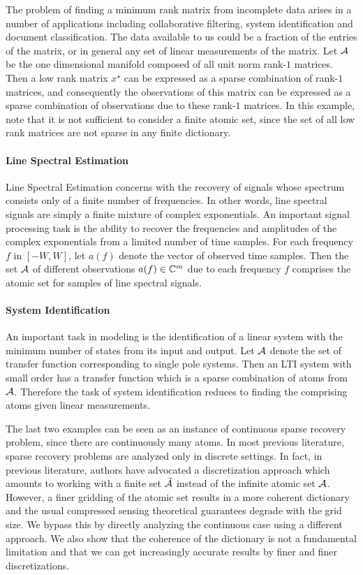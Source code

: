 The problem of finding a minimum rank matrix from incomplete data arises in a
number of applications including collaborative filtering, system identification
and document classification. The data available to us could be a fraction of the
entries of the matrix, or in general any set of linear measurements of the
matrix. Let $\mathcal{A}$ be the one dimensional manifold composed of all unit norm
rank-$1$ matrices. Then a low rank matrix $x^\star$ can be expressed as a sparse
combination of rank-$1$ matrices, and consequently the observations of this
matrix can be expressed as a sparse combination of observations due to these
rank-$1$ matrices. In this example, note that it is not sufficient to consider a
finite atomic set, since the set of all low rank matrices are not sparse in any
finite dictionary.

\paragraph{Line Spectral Estimation} Line Spectral Estimation concerns with the
recovery of signals whose spectrum consists only of a finite number of
frequencies. In other words, line spectral signals are simply a finite mixture
of complex exponentials. An important signal processing task is the ability to
recover the frequencies and amplitudes of the complex exponentials from a
limited number of time samples. For each frequency $f$ in $[-W,W]$, let $a(f)$
denote the vector of observed time samples. Then the set $\mathcal{A}$ of different
observations $a(f) \in \mathbb{C}^m$ due to each frequency $f$ comprises the atomic set
for samples of line spectral signals.

\paragraph{System Identification} An important task in modeling is the
identification of a linear system with the minimum number of states from its
input and output. Let $\mathcal{A}$ denote the set of transfer function corresponding to
single pole systems. Then an LTI system with small order has a transfer function
which is a sparse combination of atoms from $\mathcal{A}$. Therefore the task of system
identification reduces to finding the comprising atoms given linear
measurements.

The last two examples can be seen as an instance of continuous sparse recovery
problem, since there are continuously many atoms. In most previous literature,
sparse recovery problems are analyzed only in discrete settings. In fact, in
previous literature, authors have advocated a discretization approach which
amounts to working with a finite set $\tilde{\mathcal{A}}$ instead of the infinite atomic
set $\mathcal{A}$. However, a finer gridding of the atomic set results in a more coherent
dictionary and the usual compressed sensing theoretical guarantees degrade with
the grid size. We bypass this by directly analyzing the continuous case using a
different approach. We also show that the coherence of the dictionary is not a
fundamental limitation and that we can get increasingly accurate results by
finer and finer discretizations. 

